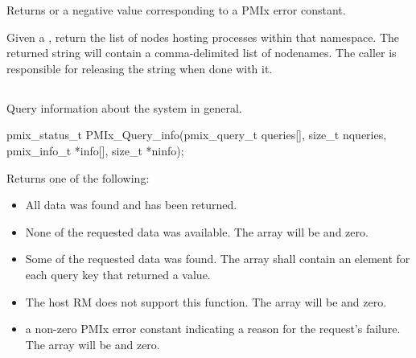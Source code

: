 Returns  or a negative value corresponding to a PMIx error constant.

\descr

Given a , return the list of nodes hosting processes within that namespace.
The returned string will contain a comma-delimited list of nodenames.
The caller is responsible for releasing the string when done with it.


\subsection{}

\summary

Query information about the system in general.

\format

\cspecificstart
\begin{codepar}
pmix_status_t
PMIx_Query_info(pmix_query_t queries[], size_t nqueries,
                pmix_info_t *info[], size_t *ninfo);
\end{codepar}
\cspecificend

\begin{arglist}
\end{arglist}

Returns one of the following:

\begin{itemize}
\item {} All data was found and has been returned.

\item {} None of the requested data was available.
The  array will be  and  zero.
\item {} Some of the requested data was found.
The  array shall contain an element for each query key that returned a value.

\item {} The host \ac{RM} does not support this function. The  array will be  and  zero.

\item a non-zero \ac{PMIx} error constant indicating a reason for the request's failure. The  array will be  and  zero.
\end{itemize}

